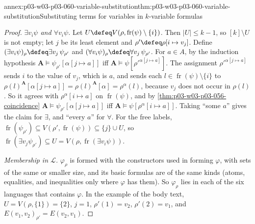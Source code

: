 \begin{annexitem}{annex:p03-w03-p03-060-variable-substitution}{thm:p03-w03-p03-060-variable-substitution}{Substituting terms for variables in \(k\)-variable formulas}
\begin{proof}
\emph{\(\exists v_i\psi\) and \(\forall v_i\psi\).} Let
\(U\defeq V(\rho,\operatorname{fr}(\psi)\setminus\{i\})\). Then
\(|U|\le k-1\), so \([k]\setminus U\) is not empty; let \(j\) be its least
element and \(\rho'\defeq\rho[i\mapsto v_j]\). Define
\((\exists v_i\psi)_\rho\defeq\exists v_j\,\psi_{\rho'}\) and
\((\forall v_i\psi)_\rho\defeq\forall v_j\,\psi_{\rho'}\). For \(a\in A\),
by the induction hypothesis
\(\mathbf A\models\psi_{\rho'}[\alpha[j\mapsto a]]\) iff
\(\mathbf A\models\psi[\rho'^{\alpha[j\mapsto a]}]\). The assignment
\(\rho'^{\alpha[j\mapsto a]}\) sends \(i\) to the value of \(v_j\), which
is \(a\), and sends each \(l\in\operatorname{fr}(\psi)\setminus\{i\}\) to
\(\rho(l)^{\mathbf A}[\alpha[j\mapsto a]]=\rho(l)^{\mathbf A}[\alpha]=\rho^\alpha(l)\),
because \(v_j\) does not occur in \(\rho(l)\). So it agrees with
\(\rho^\alpha[i\mapsto a]\) on \(\operatorname{fr}(\psi)\), and by
\cref{thm:p03-w03-p03-056-coincidence}
\(\mathbf A\models\psi_{\rho'}[\alpha[j\mapsto a]]\) iff
\(\mathbf A\models\psi[\rho^\alpha[i\mapsto a]]\). Taking ``some \(a\)''
gives the claim for \(\exists\), and ``every \(a\)'' for \(\forall\). For
the free labels,
\(\operatorname{fr}(\psi_{\rho'})\subseteq V(\rho',\operatorname{fr}(\psi))\subseteq\{j\}\cup U\),
so
\(\operatorname{fr}(\exists v_j\psi_{\rho'})\subseteq U=V(\rho,\operatorname{fr}(\exists v_i\psi))\).

\emph{Membership in \(\mathcal L\).} \(\varphi_\rho\) is formed with the
constructors used in forming \(\varphi\), with sets of the same or smaller
size, and its basic formulas are of the same kinds (atoms, equalities, and
inequalities only where \(\varphi\) has them). So \(\varphi_\rho\) lies in
each of the six languages that contains \(\varphi\). In the example of the
body text, \(U=V(\rho,\{1\})=\{2\}\), \(j=1\), \(\rho'(1)=v_2\),
\(\rho'(2)=v_1\), and \(E(v_1,v_2)_{\rho'}=E(v_2,v_1)\).
\end{proof}
\end{annexitem}

